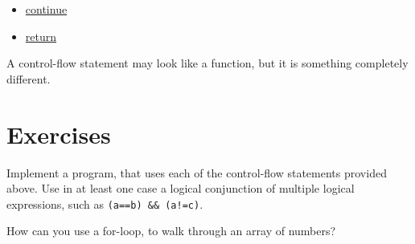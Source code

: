 \documentclass{dcbl/challenge}
\begin{document}
\begin{itemize}
    \item \href{https://godbolt.org/#g:!((g:!((g:!((h:codeEditor,i:(filename:'1',fontScale:14,fontUsePx:'0',j:1,lang:___c,selection:(endColumn:2,endLineNumber:13,positionColumn:2,positionLineNumber:13,selectionStartColumn:2,selectionStartLineNumber:13,startColumn:2,startLineNumber:13),source:'%23include+%3Cstdio.h%3E%0A%0Aint+main()+%7B%0A++int+i,+j%3B%0A++for+(i+%3D+1%3B+i+%3C+3%3B+i%2B%2B)+%7B%0A++++for+(j+%3D+1%3B+j+%3C+5%3B+j%2B%2B)+%7B%0A++++++if+(j+%3D%3D+2)%0A++++++++continue%3B%0A++++++printf(%22%25d%5Cn%22,+j)%3B%0A++++%7D%0A++%7D%0A++return+0%3B%0A%7D'),l:'5',n:'0',o:'C+source+%231',t:'0')),k:55.65441596385128,l:'4',m:100,n:'0',o:'',s:0,t:'0'),(g:!((h:executor,i:(argsPanelShown:'1',compilationPanelShown:'0',compiler:cg121,compilerName:'',compilerOutShown:'0',execArgs:'',execStdin:'',fontScale:14,fontUsePx:'0',j:1,lang:___c,libs:!(),options:'',overrides:!(),runtimeTools:!(),source:1,stdinPanelShown:'1',tree:'1',wrap:'1'),l:'5',n:'0',o:'Executor+x86-64+gcc+12.1+(C,+Editor+%231)',t:'0')),k:44.34558403614872,l:'4',n:'0',o:'',s:0,t:'0')),l:'2',n:'0',o:'',t:'0')),version:4}{continue}
    \item \href{https://godbolt.org/#g:!((g:!((g:!((h:codeEditor,i:(filename:'1',fontScale:14,fontUsePx:'0',j:1,lang:___c,selection:(endColumn:2,endLineNumber:13,positionColumn:2,positionLineNumber:13,selectionStartColumn:2,selectionStartLineNumber:13,startColumn:2,startLineNumber:13),source:'%23include+%3Cstdio.h%3E%0A%0Achar+func()+%7B%0A++printf(%22The+Control-Flow+is+here+%5Cn%22)%3B%0A++return+1%3B%0A++%0A%7D%0Aint+main()+%7B%0A++printf(%22Control-Flow+starts+here+%5Cn%22)%3B%0A++func()%3B%0A++printf(%22Control-Flow+is+back+in+main%22)%3B%0A++return+0%3B%0A%7D'),l:'5',n:'0',o:'C+source+%231',t:'0')),k:55.65441596385128,l:'4',m:100,n:'0',o:'',s:0,t:'0'),(g:!((h:executor,i:(argsPanelShown:'1',compilationPanelShown:'0',compiler:cg121,compilerName:'',compilerOutShown:'0',execArgs:'',execStdin:'',fontScale:14,fontUsePx:'0',j:1,lang:___c,libs:!(),options:'',overrides:!(),runtimeTools:!(),source:1,stdinPanelShown:'1',tree:'1',wrap:'1'),l:'5',n:'0',o:'Executor+x86-64+gcc+12.1+(C,+Editor+%231)',t:'0')),k:44.34558403614872,l:'4',n:'0',o:'',s:0,t:'0')),l:'2',n:'0',o:'',t:'0')),version:4}{return}
\end{itemize}
A control-flow statement may look like a function, but it is something completely different.

    
\section*{Exercises}
\begin{aufgabe}
    Implement a program, that uses each of the control-flow statements provided above.
    Use in at least one case a logical conjunction of multiple logical expressions, such as \texttt{(a==b) \&\& (a!=c)}.
\end{aufgabe}

\begin{aufgabe}
    How can you use a for-loop, to walk through an array of numbers?
\end{aufgabe}
\end{document}
